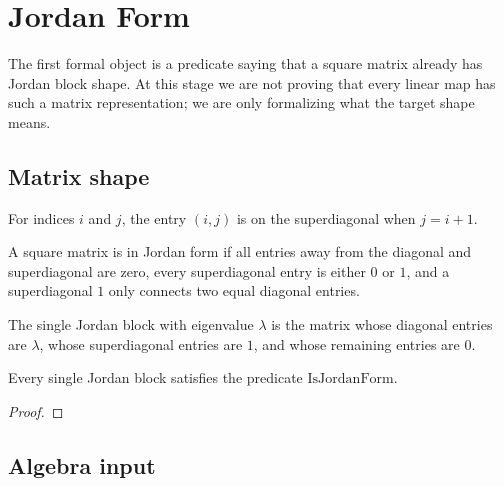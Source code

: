 \chapter{Jordan Form}

The first formal object is a predicate saying that a square matrix already has
Jordan block shape.  At this stage we are not proving that every linear map has
such a matrix representation; we are only formalizing what the target shape
means.

\section{Matrix shape}

\begin{definition}
  \label{def:is_superdiagonal}
  \leanok
  For indices \(i\) and \(j\), the entry \((i,j)\) is on the superdiagonal when
  \(j = i + 1\).
\end{definition}

\begin{definition}
  \label{def:is_jordan_form}
  \leanok
  A square matrix is in Jordan form if all entries away from the diagonal and
  superdiagonal are zero, every superdiagonal entry is either \(0\) or \(1\),
  and a superdiagonal \(1\) only connects two equal diagonal entries.
\end{definition}

\begin{definition}
  \label{def:jordan_block}
  \leanok
  The single Jordan block with eigenvalue \(\lambda\) is the matrix whose
  diagonal entries are \(\lambda\), whose superdiagonal entries are \(1\), and
  whose remaining entries are \(0\).
\end{definition}

\begin{theorem}
  \label{thm:jordan_block_is_jordan_form}
  \leanok
  Every single Jordan block satisfies the predicate
  \(\mathrm{IsJordanForm}\).
\end{theorem}

\begin{proof}
  \leanok
\end{proof}

\section{Algebra input}

